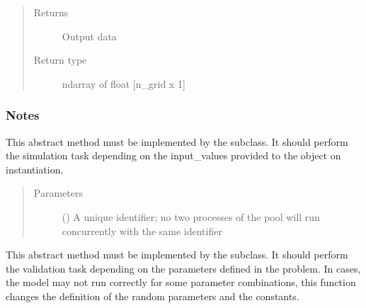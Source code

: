 \documentclass[letterpaper,10pt,english,openany,oneside]{sphinxmanual}
\begin{document}
\begin{fulllineitems}
\begin{quote}
\begin{description}
\begin{itemize}
\end{itemize}

\item[{Returns}] \leavevmode
{} \textendash{} Output data

\item[{Return type}] \leavevmode
ndarray of float {[}n\_grid x 1{]}

\end{description}\end{quote}
\subsubsection*{Notes}

\begin{figure}[htbp]
\centering

\noindent{}
\end{figure}

\begin{fulllineitems}
\label{\detokenize{pygpc.testfunctions:pygpc.testfunctions.testfunctions.Lim2002.simulate}}
This abstract method must be implemented by the subclass.
It should perform the simulation task depending on the input\_values provided to the object on instantiation.
\begin{quote}\begin{description}
\item[{Parameters}] \leavevmode
{} () \textendash{} A unique identifier; no two processes of the pool will run concurrently with the same identifier

\end{description}\end{quote}

\end{fulllineitems}


\begin{fulllineitems}
\label{\detokenize{pygpc.testfunctions:pygpc.testfunctions.testfunctions.Lim2002.validate}}
This abstract method must be implemented by the subclass.
It should perform the validation task depending on the parameters defined in the problem.
In cases, the model may not run correctly for some parameter combinations, this function changes the definition
of the random parameters and the constants.

\end{fulllineitems}


\end{fulllineitems}
\end{document}
